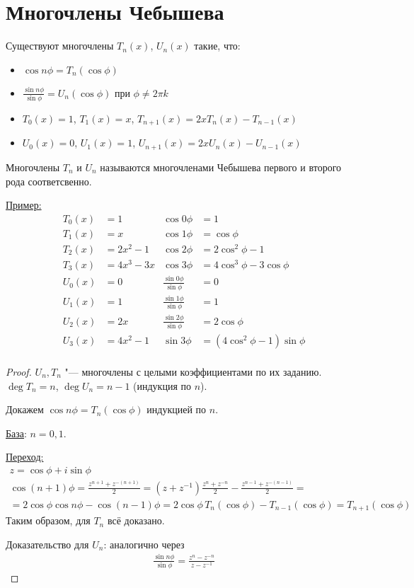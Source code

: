 \section{Многочлены Чебышева}
\begin{theorem}{}
Существуют многочлены $T_n(x)$, $U_n(x)$ такие, что:
\begin{itemize}
\item $\cos{n \phi} = T_n(\cos \phi)$
\item $\frac{\sin{n \phi}}{\sin \phi} = U_n(\cos \phi)$ при $\phi \ne 2 \pi k$
\item $T_0(x) = 1$, $T_1(x) = x$, $T_{n + 1}(x) = 2xT_n(x) - T_{n - 1}(x)$
\item $U_0(x) = 0$, $U_1(x) = 1$, $U_{n + 1}(x) = 2xU_n(x) - U_{n - 1}(x)$
\end{itemize}
\end{theorem}
\begin{Def} 
Многочлены $T_n$ и $U_n$ называются многочленами Чебышева первого и второго рода соответсвенно.
\end{Def}

\underline{Пример:} 
\begin{align*}
T_0(x) &= 1 & \cos 0\phi &= 1 \\ 
T_1(x) &= x & \cos 1\phi &= \cos \phi\\ 
T_2(x) &= 2x^2 - 1 & \cos 2\phi &= 2 \cos^2 \phi - 1 \\
T_3(x) &= 4x^3 - 3x & \cos 3\phi &= 4 \cos^3 \phi - 3\cos \phi \\
U_0(x) &= 0 & \frac{\sin 0\phi}{\sin \phi} &= 0\\ 
U_1(x) &= 1 & \frac{\sin 1\phi}{\sin \phi} &= 1\\ 
U_2(x) &= 2x & \frac{\sin 2\phi}{\sin \phi} &= 2\cos \phi \\
U_3(x) &= 4x^2 - 1 & \sin 3\phi &= (4\cos^2 \phi - 1)\sin \phi \\
\end{align*}

\begin{proof}
$U_n, T_n$ "--- многочлены с целыми коэффициентами по их заданию. $\deg T_n = n$, $\deg U_n = n - 1$ (индукция по $n$).

Докажем $\cos n\phi = T_n(\cos\phi)$ индукцией по $n$.

\underline{База}: $n = 0, 1$.

\underline{Переход:}
\begin{gather*}
z = \cos\phi + i \sin\phi \\
\cos (n + 1)\phi = \frac{z^{n + 1} + z^{-(n + 1)}}{2} = (z + z^{-1})\frac{z^n + z^{-n}}{2} - \frac{z^{n - 1} + z^{-(n - 1)}}{2}= \\
= 2\cos\phi\cos{n\phi} - \cos{(n - 1)\phi} = 2 \cos \phi\, T_n(\cos \phi) - T_{n - 1}(\cos\phi) = T_{n + 1}(\cos \phi)
\end{gather*}
Таким образом, для $T_n$ всё доказано.

Доказательство для $U_n$: аналогично через
\begin{gather*}
\frac{\sin{n\phi}}{\sin\phi} = \frac{z^n - z^{-n}}{z - z^{-1}}
\end{gather*}
\end{proof}